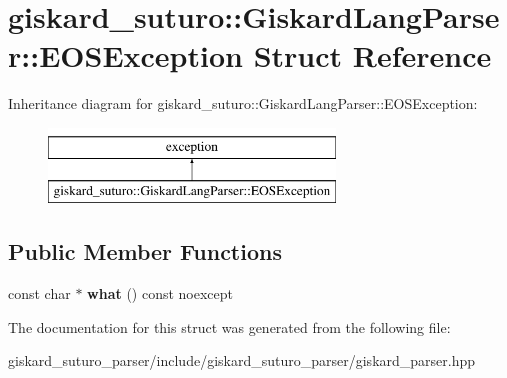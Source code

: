 \hypertarget{structgiskard__suturo_1_1GiskardLangParser_1_1EOSException}{\section{giskard\-\_\-suturo\-:\-:Giskard\-Lang\-Parser\-:\-:E\-O\-S\-Exception Struct Reference}
\label{structgiskard__suturo_1_1GiskardLangParser_1_1EOSException}
}
Inheritance diagram for giskard\-\_\-suturo\-:\-:Giskard\-Lang\-Parser\-:\-:E\-O\-S\-Exception\-:\begin{figure}[H]
\begin{center}
\leavevmode
\includegraphics[height=2.000000cm]{structgiskard__suturo_1_1GiskardLangParser_1_1EOSException}
\end{center}
\end{figure}
\subsection*{Public Member Functions}
\begin{DoxyCompactItemize}
\item 
\hypertarget{structgiskard__suturo_1_1GiskardLangParser_1_1EOSException_abcfe54b8cc274217174feefae2ce021c}{const char $\ast$ {\bfseries what} () const noexcept}\label{structgiskard__suturo_1_1GiskardLangParser_1_1EOSException_abcfe54b8cc274217174feefae2ce021c}

\end{DoxyCompactItemize}


The documentation for this struct was generated from the following file\-:\begin{DoxyCompactItemize}
\item 
giskard\-\_\-suturo\-\_\-parser/include/giskard\-\_\-suturo\-\_\-parser/giskard\-\_\-parser.\-hpp\end{DoxyCompactItemize}
